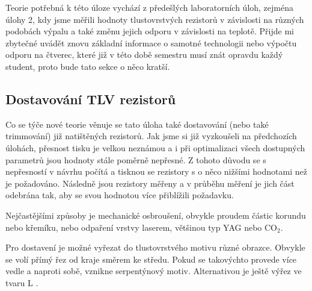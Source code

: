 Teorie potřebná k této úloze vychází z předešlých laboratorních úloh, zejména úlohy 2, kdy jsme měřili hodnoty tlustovrstvých rezistorů v závislosti na různých podobách výpalu a také změnu jejich odporu v závislosti na teplotě. Přijde mi zbytečné uvádět znovu základní informace o samotné technologii nebo výpočtu odporu na čtverec, které již v této době semestru musí znát opravdu každý student, proto bude tato sekce o něco kratší.

\subsection{Dostavování TLV rezistorů}
Co se týče nové teorie věnuje se tato úloha také dostavování (nebo také trimmování) již natištěných rezistorů. 
Jak jsme si již vyzkoušeli na předchozích úlohách, přesnost tisku je velkou neznámou a i při optimalizaci všech dostupných parametrů jsou hodnoty stále poměrně nepřesné. Z tohoto důvodu se s nepřesností v návrhu počítá a tisknou se rezistory s o něco nižšími hodnotami než je požadováno. Následně jsou rezistory měřeny a v průběhu měření je jich část odebrána tak, aby se svou hodnotou více přiblížili požadavku. 

Nejčastějšími způsoby je mechanické osbroušení, obvykle proudem částic korundu nebo křemíku, nebo odpaření vrstvy laserem, většinou typ YAG nebo CO\(_{2}\). 

Pro dostavení je možné vyřezat do tlustovrstvého motivu různé obrazce. Obvykle se volí přímý řez od kraje směrem ke středu. Pokud se takovýchto provede více vedle a naproti sobě, vznikne serpentýnový motiv. Alternativou je ještě výřez ve tvaru L \cite{zadani,schroeder2022trimming}.
